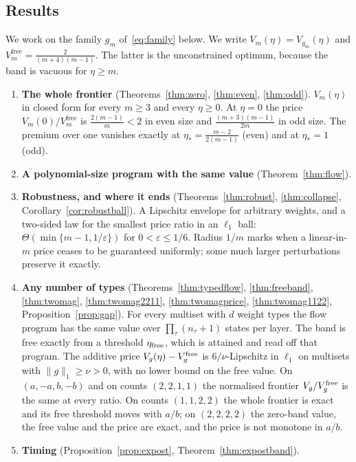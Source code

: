 \subsection{Results}

We work on the family $g_{m}$ of~\eqref{eq:family} below. We write
$V_{m}(\eta)=V_{g_{m}}(\eta)$ and $V^{\mathrm{free}}_{m}=\frac{2}{(m+4)(m-1)}$. The latter is
the unconstrained optimum, because the band is vacuous for $\eta\ge m$.

\begin{enumerate}
\item[1)] \textbf{The whole frontier} (Theorems~\ref{thm:zero}, \ref{thm:even},
\ref{thm:odd}). $V_{m}(\eta)$ in closed form for every $m\ge3$ and every $\eta\ge0$. At
$\eta=0$ the price $V_{m}(0)/V^{\mathrm{free}}_{m}$ is $\frac{2(m-1)}{m}<2$ in even size and
$\frac{(m+3)(m-1)}{2m}$ in odd size. The premium over one vanishes exactly at $\eta_{*}=\frac{m-2}{2(m-1)}$
(even) and at $\eta_{*}=1$ (odd).
\item[2)] \textbf{A polynomial-size program with the same value} (Theorem~\ref{thm:flow}).
\item[3)] \textbf{Robustness, and where it ends} (Theorems~\ref{thm:robust},
\ref{thm:collapse}, Corollary~\ref{cor:robustball}). A Lipschitz envelope for arbitrary
weights, and a two-sided law for the smallest price ratio in an $\ell_1$ ball:
$\Theta(\min\{m-1,1/\varepsilon\})$ for $0<\varepsilon\le1/6$.
Radius $1/m$ marks when a linear-in-$m$ price ceases to be guaranteed uniformly;
some much larger perturbations preserve it exactly.
\item[4)] \textbf{Any number of types} (Theorems~\ref{thm:typedflow}, \ref{thm:freeband},
\ref{thm:twomag}, \ref{thm:twomag2211}, \ref{thm:twomagprice}, \ref{thm:twomag1122},
Proposition~\ref{prop:gap}). For every multiset with $d$ weight types the flow program has the
same value over $\prod_\tau(n_\tau+1)$ states per layer. The band is free exactly from a threshold
$\eta_{\rm free}$, which is attained and read off that program. The additive price
$V_g(\eta)-V^{\rm free}_g$ is $6/\nu$-Lipschitz in $\ell_1$ on multisets with $\|g\|_1\ge\nu>0$, with
no lower bound on the free value.
On $(a,-a,b,-b)$ and on counts $(2,2,1,1)$ the normalised frontier $V_g/V_g^{\rm free}$ is the same at
every ratio. On counts $(1,1,2,2)$ the whole frontier is exact and its free threshold moves with
$a/b$; on $(2,2,2,2)$ the zero-band value, the free value and the price are exact, and the price
is not monotone in $a/b$.
\item[5)] \textbf{Timing} (Proposition~\ref{prop:expost}, Theorem~\ref{thm:expostband}).

\end{enumerate}

